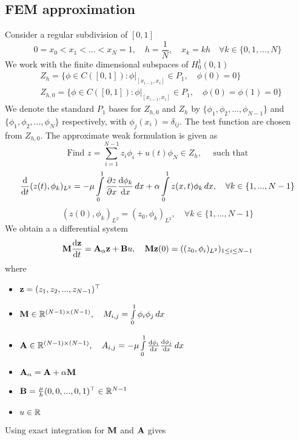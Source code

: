 \documentclass[12pt]{article}
\begin{document}
\subsection{FEM approximation}
Consider a regular subdivision of $[0,1]$
\[
 0 = x_0 < x_1 < ... < x_N = 1, \quad h = \frac{1}{N}, \quad x_k = kh \quad \forall k \in \{0,1,...,N\}
\]
We work with the finite dimensional subspaces of $H^1_{0}(0,1)$
\begin{equation*}
\begin{aligned}
  & Z_h = \{ \phi \in C([0,1]) : \phi|_{[x_{i-1},x_i]} \in P_1, \quad \phi(0) = 0 \} \\
  & Z_{h,0} = \{ \phi \in C([0,1]) : \phi|_{[x_{i-1},x_i]} \in P_1, \quad \phi(0) = \phi(1) = 0 \}
\end{aligned}
\end{equation*}
We denote the standard $P_1$ bases for $Z_{h,0}$ and $Z_{h}$ by $\{\phi_1, \phi_2,...,\phi_{N-1}\}$ and $\{\phi_1, \phi_2,...,\phi_N\}$ respectively, with $\phi_j(x_i) = \delta_{ij}$. The test function are chosen from $Z_{h,0}$. The approximate weak formulation is given as
\[
 \text{Find } z = \sum \limits_{i=1}^{N-1} z_i \phi_i + u(t) \phi_N \in Z_h, \quad \text{ such that}
\]
\[
 \frac{\textrm{d} }{\textrm{d} t}(z(t), \phi_k)_{L^2} = - \mu \int \limits^{1}_{0} \frac{\partial z}{\partial x} \frac{\textrm{d} \phi_k}{\textrm{d} x} \, dx +  \alpha \int \limits^{1}_{0} z(x,t) \phi_k \, dx, \quad \forall k \in \{1,..., N-1\}
\]
\[
 (z(0),\phi_k)_{L^2} = (z_0 ,\phi_k)_{L^2}, \quad \forall k \in \{1,..., N-1\}
\]
We obtain a a differential system 
\[
 {\mathbf M} \frac{\textrm{d} {\mathbf z}}{\textrm{d} t} = {\mathbf A}_\alpha {\mathbf z} + {\mathbf B} u , \quad {\mathbf M} {\mathbf z}(0) = ((z_0,\phi_i)_{L^2})_{1\le i \le {N-1}}
\]
where
\begin{itemize}
 \item ${\mathbf z} = (z_1,z_2,...,z_{N-1})^\top$
 \item ${\mathbf M} \in \mathbb{R}^{(N-1) \times (N-1)}, \quad M_{i,j} = \int \limits_0^1 \phi_i \phi_j \, dx$
 \item ${\mathbf A} \in \mathbb{R}^{(N-1) \times (N-1)}, \quad A_{i,j} = - \mu \int \limits_0^1 \frac{\textrm{d} \phi_i}{\textrm{d} x} \frac{\textrm{d} \phi_j}{\textrm{d} x} \, dx$
 \item ${\mathbf A}_\alpha = {\mathbf A} + \alpha {\mathbf M}$
 \item ${\mathbf B} =  \frac{\mu}{h} (0,0,...,0,1)^\top \in \mathbb{R}^{N-1}$
 \item $u \in \mathbb{R}$
\end{itemize}
Using exact integration for ${\mathbf M}$ and ${\mathbf A}$ gives
\end{document}
